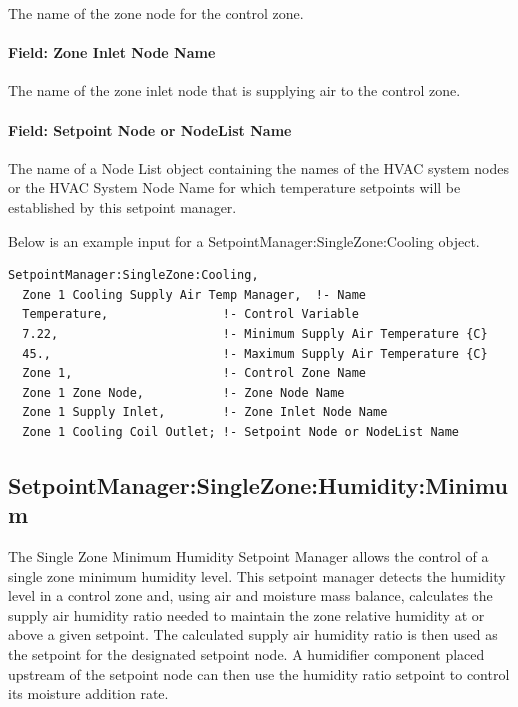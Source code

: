 The name of the zone node for the control zone.

\paragraph{Field: Zone Inlet Node Name}\label{field-zone-inlet-node-name-2}

The name of the zone inlet node that is supplying air to the control zone.

\paragraph{Field: Setpoint Node or NodeList Name}\label{field-setpoint-node-or-nodelist-name-5}

The name of a Node List object containing the names of the HVAC system nodes or the HVAC System Node Name for which temperature setpoints will be established by this setpoint manager.

Below is an example input for a SetpointManager:SingleZone:Cooling object.

\begin{lstlisting}
SetpointManager:SingleZone:Cooling,
  Zone 1 Cooling Supply Air Temp Manager,  !- Name
  Temperature,                !- Control Variable
  7.22,                       !- Minimum Supply Air Temperature {C}
  45.,                        !- Maximum Supply Air Temperature {C}
  Zone 1,                     !- Control Zone Name
  Zone 1 Zone Node,           !- Zone Node Name
  Zone 1 Supply Inlet,        !- Zone Inlet Node Name
  Zone 1 Cooling Coil Outlet; !- Setpoint Node or NodeList Name
\end{lstlisting}

\subsection{SetpointManager:SingleZone:Humidity:Minimum}\label{setpointmanagersinglezonehumidityminimum}

The Single Zone Minimum Humidity Setpoint Manager allows the control of a single zone minimum humidity level. This setpoint manager detects the humidity level in a control zone and, using air and moisture mass balance, calculates the supply air humidity ratio needed to maintain the zone relative humidity at or above a given setpoint. The calculated supply air humidity ratio is then used as the setpoint for the designated setpoint node. A humidifier component placed upstream of the setpoint node can then use the humidity ratio setpoint to control its moisture addition rate.

